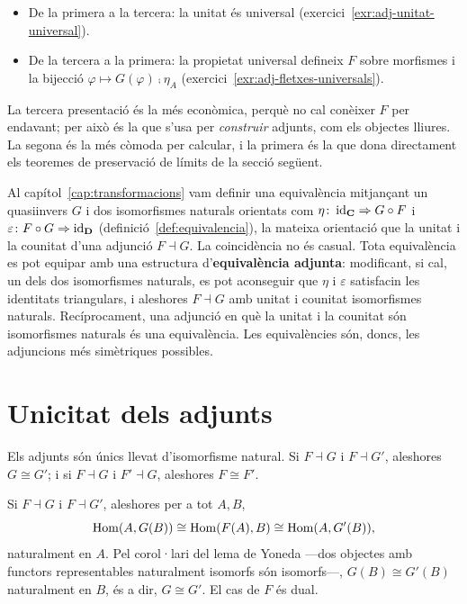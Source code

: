 \begin{observacio}
\begin{itemize}
\item De la primera a la tercera: la unitat és universal (exercici~\ref{exr:adj-unitat-universal}).
\item De la tercera a la primera: la propietat universal defineix $F$ sobre morfismes i la bijecció $\varphi\mapsto G(\varphi)\comp\eta_A$ (exercici~\ref{exr:adj-fletxes-universals}).
\end{itemize}
La tercera presentació és la més econòmica, perquè no cal conèixer $F$ per endavant; per això és la que s'usa per \emph{construir} adjunts, com els objectes lliures. La segona és la més còmoda per calcular, i la primera és la que dona directament els teoremes de preservació de límits de la secció següent.
\end{observacio}

\begin{observacio}
Al capítol~\ref{cap:transformacions} vam definir una equivalència mitjançant un quasiinvers $G$ i dos isomorfismes naturals orientats com $\eta\colon\operatorname{id}_{\mathbf{C}}\Rightarrow G\circ F$ i $\varepsilon\colon F\circ G\Rightarrow\operatorname{id}_{\mathbf{D}}$ (definició~\ref{def:equivalencia}), la mateixa orientació que la unitat i la counitat d'una adjunció $F\dashv G$. La coincidència no és casual. Tota equivalència es pot equipar amb una estructura d'\textbf{equivalència adjunta}: modificant, si cal, un dels dos isomorfismes naturals, es pot aconseguir que $\eta$ i $\varepsilon$ satisfacin les identitats triangulars, i aleshores $F\dashv G$ amb unitat i counitat isomorfismes naturals. Recíprocament, una adjunció en què la unitat i la counitat són isomorfismes naturals és una equivalència. Les equivalències són, doncs, les adjuncions més simètriques possibles.
\end{observacio}

\section{Unicitat dels adjunts}

\begin{proposicio}
Els adjunts són únics llevat d'isomorfisme natural. Si $F\dashv G$ i $F\dashv G'$, aleshores $G\cong G'$; i si $F\dashv G$ i $F'\dashv G$, aleshores $F\cong F'$.
\end{proposicio}

\begin{prova}
Si $F\dashv G$ i $F\dashv G'$, aleshores per a tot $A,B$,
\[
\operatorname{Hom}(A,G(B))\cong\operatorname{Hom}(F(A),B)\cong\operatorname{Hom}(A,G'(B)),
\]
naturalment en $A$. Pel corol·lari del lema de Yoneda ---dos objectes amb functors representables naturalment isomorfs són isomorfs---, $G(B)\cong G'(B)$ naturalment en $B$, és a dir, $G\cong G'$. El cas de $F$ és dual.
\end{prova}

